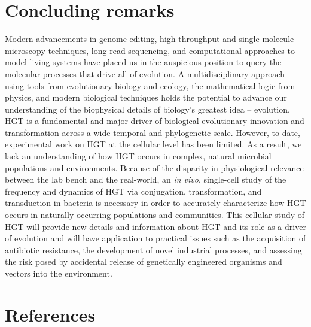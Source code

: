 \section*{Concluding remarks}

\indent Modern advancements in genome-editing, high-throughput and single-molecule
microscopy techniques, long-read sequencing, and computational approaches to
model living systems have placed us in the auspicious position to query the
molecular processes that drive all of evolution. A multidisciplinary approach
using tools from evolutionary biology and ecology, the mathematical logic from
physics, and modern biological techniques holds the potential to advance our
understanding of the biophysical details of biology's greatest idea --
evolution. HGT is a fundamental and major driver of biological evolutionary
innovation and transformation across a wide temporal and phylogenetic scale.
However, to date, experimental work on HGT at the cellular level has been
limited. As a result, we lack an understanding of how HGT occurs in complex,
natural microbial populations and environments. Because of the disparity in
physiological relevance between the lab bench and the real-world, an
\textit{in vivo}, single-cell study of the frequency and dynamics of HGT via
conjugation, transformation, and transduction in bacteria is necessary in order
to accurately characterize how HGT occurs in naturally occurring populations and
communities. This cellular study of HGT will provide new details and information
about HGT and its role as a driver of evolution and will have application to
practical issues such as the acquisition of antibiotic resistance, the
development of novel industrial processes, and assessing the risk posed by
accidental release of genetically engineered organisms and vectors into the
environment. 


\section*{References} 
 


